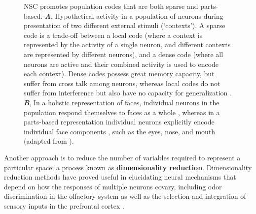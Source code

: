 \begin{figure}[h]
	\centering
    \caption{\Acf{NSC} promotes population codes that are both sparse and parts-based.
    \textbf{\emph{A}},
    	   Hypothetical activity in a population of neurons
           during presentation of two different external stimuli (`contexts').
           A sparse code is a trade-off between a local code
           (where a context is represented by the activity of a single neuron,
           and different contexts are represented by different neurons), and a
           dense code (where all neurons are active and their combined activity is
           used to encode each context).
           Dense codes possess great memory capacity, but suffer from cross talk
           among neurons, whereas local codes do not suffer from interference
           but also have no capacity for generalization
           .
     \textbf{\emph{B}},
           In a holistic representation of faces, 
           individual neurons in the population
           respond themselves to faces as a whole \cite{TanakaFarah1993},
           whereas in a parts-based representation
           individual neurons explicitly encode individual face components
           \cite{Palmer1977},
           such as the eyes, nose, and mouth
           (adapted from \cite{LeeSeung1999} ).}
	\label{fig:sparse-parts}
\end{figure}


Another approach is to reduce the number of
variables required to represent a particular  space;
a process known as
\textbf{dimensionality reduction}.
Dimensionality reduction methods have proved useful in elucidating neural mechanisms
that depend on how the responses of multiple neurons covary,
including odor discrimination in the olfactory system \cite{Broome2006,Koulakov2011}
as well as the selection and integration of sensory inputs 
in the prefrontal cortex \cite{Mante2013,CunninghamYu2014}.

